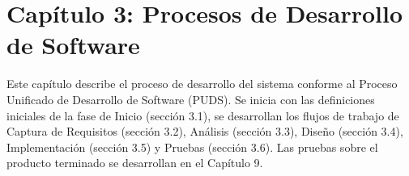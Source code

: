 
\newpage
\section{Capítulo 3: Procesos de Desarrollo de Software}\label{cap:procesos_puds}

Este capítulo describe el proceso de desarrollo del sistema conforme al Proceso Unificado de Desarrollo de Software (PUDS). Se inicia con las definiciones iniciales de la fase de Inicio (sección 3.1), se desarrollan los flujos de trabajo de Captura de Requisitos (sección 3.2), Análisis (sección 3.3), Diseño (sección 3.4), Implementación (sección 3.5) y Pruebas (sección 3.6). Las pruebas sobre el producto terminado se desarrollan en el Capítulo 9.













